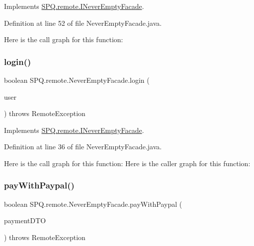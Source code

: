Implements \mbox{\hyperlink{interface_s_p_q_1_1remote_1_1_i_never_empty_facade_aa329dfc23ab0832e73802bf2df90b9e0}{S\+P\+Q.\+remote.\+I\+Never\+Empty\+Facade}}.



Definition at line 52 of file Never\+Empty\+Facade.\+java.

Here is the call graph for this function\+:
\mbox{\label{class_s_p_q_1_1remote_1_1_never_empty_facade_a3fdd96efa1256ea520a497b8a20578e8}} 
\subsubsection{\texorpdfstring{login()}{login()}}
{\footnotesize\ttfamily boolean S\+P\+Q.\+remote.\+Never\+Empty\+Facade.\+login (\begin{DoxyParamCaption}\item[{\mbox{\hyperlink{class_s_p_q_1_1dto_1_1_user_d_t_o}{User\+D\+TO}}}]{user }\end{DoxyParamCaption}) throws Remote\+Exception}



Implements \mbox{\hyperlink{interface_s_p_q_1_1remote_1_1_i_never_empty_facade_a2440fa36695c63e4e4c30fc25965f853}{S\+P\+Q.\+remote.\+I\+Never\+Empty\+Facade}}.



Definition at line 36 of file Never\+Empty\+Facade.\+java.

Here is the call graph for this function\+:
Here is the caller graph for this function\+:
\mbox{\label{class_s_p_q_1_1remote_1_1_never_empty_facade_a9942c7930b5144f0677dc0fdcde25cc3}} 
\subsubsection{\texorpdfstring{pay\+With\+Paypal()}{payWithPaypal()}}
{\footnotesize\ttfamily boolean S\+P\+Q.\+remote.\+Never\+Empty\+Facade.\+pay\+With\+Paypal (\begin{DoxyParamCaption}\item[{\mbox{\hyperlink{class_s_p_q_1_1dto_1_1_payment_d_t_o}{Payment\+D\+TO}}}]{payment\+D\+TO }\end{DoxyParamCaption}) throws Remote\+Exception}



